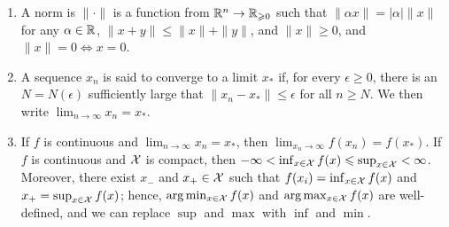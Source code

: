 \documentclass[12pt]{article}
\begin{document}
\begin{enumerate}
	\item A norm is $\|\cdot\|$ is a function from $\mathbb{R}^n \to \mathbb{R}_{\geqslant 0}$ such that $\|\alpha x\| = |\alpha|\|x\|$ for any $\alpha \in \mathbb{R}$, $\|x+y\| \le \|x\| +\|y\|$, and $\|x\| \ge 0$, and $\|x\| = 0 \iff x = 0$. 
	\item A sequence $x_n$ is said to converge to a limit $x_*$ if, for every $\epsilon \ge 0$, there is an $N = N(\epsilon)$ sufficiently large that $\|x_n - x_*\| \le \epsilon$ for all $n \ge N$. We then write $\lim_{n \to \infty} x_n = x_*$.
	\item If $f$ is continuous and $\lim_{n \to \infty} x_n = x_*$, then $\lim_{x_n \to \infty} f(x_n) = f(x_*)$. If $f$ is continuous and ${\cal X}$ is compact, then $-\infty < \inf_{x \in {\cal X}} f(x) \leqslant \sup_{x \in {\cal X}} < \infty$. Moreover, there exist $x_-$ and $x_+ \in {\cal X}$ such that $f(x_i) = \inf_{x\in {\cal X}} f(x)$ and $x_+ = \sup_{x\in {\cal X}} f(x)$; hence, $\arg\min_{x \in {\cal X}} f(x)$ and $\arg\max_{x \in {\cal X}}f(x)$ are well-defined, and we can replace $\sup$ and $\max$ with $\inf$ and $\min$.  
\end{enumerate}
\end{document}
